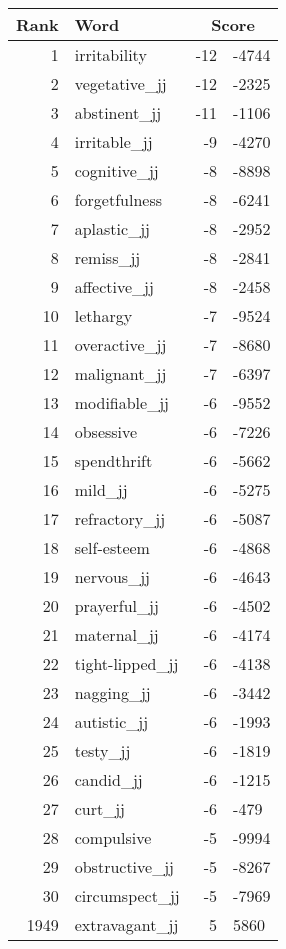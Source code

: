 \begin{longtable}[!htbp]{| rlr@{.}l |}
    \hline
    \textbf{Rank} & \textbf{Word} & \multicolumn{2}{c|}{\textbf{Score}} \\
    \hline
    \endhead
    1 & irritability & -12 & -4744 \\
    2 & vegetative\_jj & -12 & -2325 \\
    3 & abstinent\_jj & -11 & -1106 \\
    4 & irritable\_jj & -9 & -4270 \\
    5 & cognitive\_jj & -8 & -8898 \\
    6 & forgetfulness & -8 & -6241 \\
    7 & aplastic\_jj & -8 & -2952 \\
    8 & remiss\_jj & -8 & -2841 \\
    9 & affective\_jj & -8 & -2458 \\
    10 & lethargy & -7 & -9524 \\
    11 & overactive\_jj & -7 & -8680 \\
    12 & malignant\_jj & -7 & -6397 \\
    13 & modifiable\_jj & -6 & -9552 \\
    14 & obsessive & -6 & -7226 \\
    15 & spendthrift & -6 & -5662 \\
    16 & mild\_jj & -6 & -5275 \\
    17 & refractory\_jj & -6 & -5087 \\
    18 & self-esteem & -6 & -4868 \\
    19 & nervous\_jj & -6 & -4643 \\
    20 & prayerful\_jj & -6 & -4502 \\
    21 & maternal\_jj & -6 & -4174 \\
    22 & tight-lipped\_jj & -6 & -4138 \\
    23 & nagging\_jj & -6 & -3442 \\
    24 & autistic\_jj & -6 & -1993 \\
    25 & testy\_jj & -6 & -1819 \\
    26 & candid\_jj & -6 & -1215 \\
    27 & curt\_jj & -6 & -479 \\
    28 & compulsive & -5 & -9994 \\
    29 & obstructive\_jj & -5 & -8267 \\
    30 & circumspect\_jj & -5 & -7969 \\
    1949 & extravagant\_jj & 5 & 5860 \\

\end{longtable}
